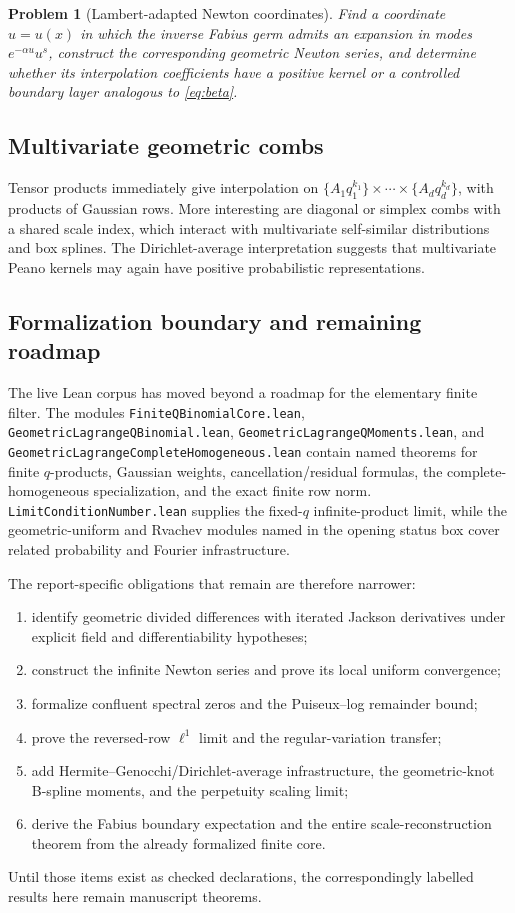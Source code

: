 \documentclass[11pt,oneside]{article}
\numberwithin{equation}{section}
\newtheorem{problem}[problem]{Problem}
\theoremstyle{definition}
\theoremstyle{remark}
\begin{document}
\begin{problem}[Lambert-adapted Newton coordinates]
Find a coordinate $u=u(x)$ in which the inverse Fabius germ admits an expansion
in modes $e^{-\alpha u}u^s$, construct the corresponding geometric Newton
series, and determine whether its interpolation coefficients have a positive
kernel or a controlled boundary layer analogous to \eqref{eq:beta}.
\end{problem}

\subsection{Multivariate geometric combs}

Tensor products immediately give interpolation on
$\{A_1q_1^{k_1}\}\times\cdots\times\{A_dq_d^{k_d}\}$, with products of
Gaussian rows.  More interesting are diagonal or simplex combs with a shared
scale index, which interact with multivariate self-similar distributions and
box splines.  The Dirichlet-average interpretation suggests that multivariate
Peano kernels may again have positive probabilistic representations.

\subsection{Formalization boundary and remaining roadmap}

The live Lean corpus has moved beyond a roadmap for the elementary finite
filter.  The modules \nolinkurl{FiniteQBinomialCore.lean},
\nolinkurl{GeometricLagrangeQBinomial.lean},
\nolinkurl{GeometricLagrangeQMoments.lean}, and
\nolinkurl{GeometricLagrangeCompleteHomogeneous.lean} contain named theorems
for finite $q$-products, Gaussian weights, cancellation/residual formulas, the
complete-homogeneous specialization, and the exact finite row norm.
\nolinkurl{LimitConditionNumber.lean} supplies the fixed-$q$ infinite-product
limit, while the geometric-uniform and Rvachev modules named in the opening
status box cover related probability and Fourier infrastructure.

The report-specific obligations that remain are therefore narrower:
\begin{enumerate}[leftmargin=2em]
\item identify geometric divided differences with iterated Jackson derivatives
under explicit field and differentiability hypotheses;
\item construct the infinite Newton series and prove its local uniform
convergence;
\item formalize confluent spectral zeros and the Puiseux--log remainder bound;
\item prove the reversed-row $\ell^1$ limit and the regular-variation transfer;
\item add Hermite--Genocchi/Dirichlet-average infrastructure, the geometric-knot
B-spline moments, and the perpetuity scaling limit;
\item derive the Fabius boundary expectation and the entire scale-reconstruction
theorem from the already formalized finite core.
\end{enumerate}
Until those items exist as checked declarations, the correspondingly labelled
results here remain manuscript theorems.
\end{document}
